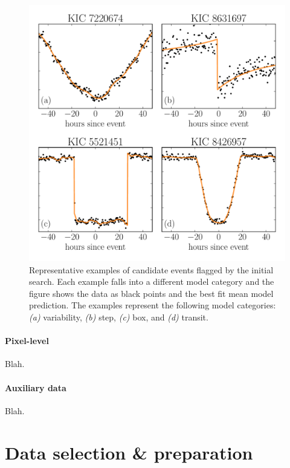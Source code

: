 \documentclass[12pt,preprint]{aastex}
\newcommand{\figlabel}[1]{\label{fig:#1}}
\newcommand{\sectlabel}[1]{\label{sect:#1}}
\begin{document}
\begin{figure}[p]
\begin{center}
\includegraphics[width=\textwidth]{figures/model_comp.pdf}
\end{center}
\caption{%
Representative examples of candidate events flagged by the initial search.
Each example falls into a different model category and the figure shows the
data as black points and the best fit mean model prediction.
The examples represent the following model categories:
\emph{(a)} variability, \emph{(b)} step, \emph{(c)} box, and \emph{(d)}
transit.
\figlabel{model-comp}}
\end{figure}

\paragraph{Pixel-level}

Blah.

\paragraph{Auxiliary data}

Blah.


\section{Data selection \& preparation}\sectlabel{data}
\end{document}
